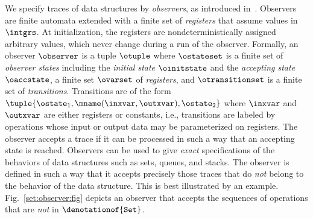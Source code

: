 We specify traces of data structures by
{\em observers}, 
as introduced in~\cite{AHHR:integrated}. 
%
Observers are
finite automata extended with a finite set of {\em registers}
that assume values in $\intgrs$. 
%
%
At initialization,
the registers are nondeterministically
assigned arbitrary values, which never change
during a run of the observer. 
%
Formally, an observer $\observer$ is a tuple
$\otuple$ where $\ostateset$ is a finite set 
of {\it observer states} including the 
{\it initial state} $\oinitstate$ and
the {\it accepting state} $\oaccstate$, 
a finite set $\ovarset$  
of {\it registers}, and $\otransitionset$ is a finite
set of {\it transitions}.
%
%
Transitions are of the form 
$\tuple{\ostate_1,\mname(\inxvar,\outxvar),\ostate_2}$ where 
$\inxvar$ and $\outxvar$ are either registers or constants, i.e.,
transitions are labeled by 
operations whose input or output data may be parameterized on registers.
%
%
The observer accepts a trace if it can  be processed in such a way that
an accepting state is reached.
%
Observers can be used to give {\it exact} specifications of
the behaviors of data structures such as sets, queues, and stacks.
%
The observer is defined in such a way that it accepts precisely those
traces that do {\em not} belong to the behavior
of the data structure.
%
This is best illustrated by an example. Fig.~\ref{set:observer:fig}
depicts an observer that accepts the
sequences of operations that are {\em not} in $\denotationof{\tt Set}$.
%

\endgroup



